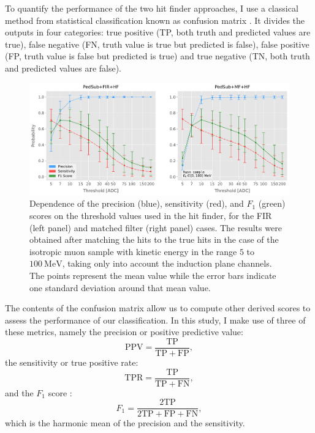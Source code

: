 To quantify the performance of the two hit finder approaches, I use a classical method from statistical classification known as confusion matrix \cite{Stehman1997}. It divides the outputs in four categories: true positive (TP, both truth and predicted values are true), false negative (FN, truth value is true but predicted is false), false positive (FP, truth value is false but predicted is true) and true negative (TN, both truth and predicted values are false).

\begin{figure}[t]
	\centering
	\includegraphics[width=.99\linewidth]{Images/Matched_Filter/hit_study_muon_scores_indct}
	\caption[Dependence of the precision, sensitivity, and $F_{1}$ scores on the threshold values used in the hit finder for the FIR and matched filters.]{Dependence of the precision (blue), sensitivity (red), and $F_{1}$ (green) scores on the threshold values used in the hit finder, for the FIR (left panel) and matched filter (right panel) cases. The results were obtained after matching the hits to the true hits in the case of the isotropic muon sample with kinetic energy in the range $5$ to $100 \ \mathrm{MeV}$, taking only into account the induction plane channels. The points represent the mean value while the error bars indicate one standard deviation around that mean value.}
	\label{fig:threshold_opt}
\end{figure}

The contents of the confusion matrix allow us to compute other derived scores to assess the performance of our classification. In this study, I make use of three of these metrics, namely the precision or positive predictive value:
\begin{equation}
	\mathrm{PPV} = \frac{\mathrm{TP}}{\mathrm{TP} + \mathrm{FP}},
\end{equation}
the sensitivity or true positive rate:
\begin{equation}
	\mathrm{TPR} = \frac{\mathrm{TP}}{\mathrm{TP} + \mathrm{FN}},
\end{equation}
and the $F_{1}$ score \cite{Taha2015}:
\begin{equation}
	F_{1} = \frac{\mathrm{2 TP}}{2\mathrm{TP} + \mathrm{FP} + \mathrm{FN}},
\end{equation}
which is the harmonic mean of the precision and the sensitivity.

